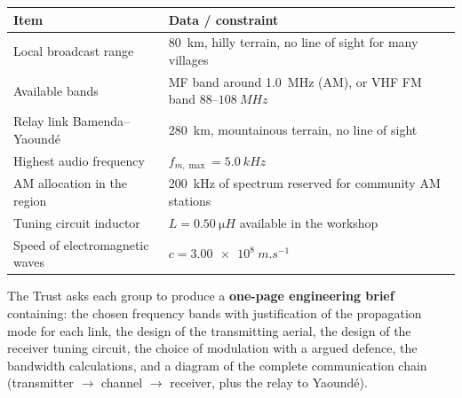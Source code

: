 \documentclass[11pt]{article}
\newcounter{popsec}
\newcounter{popsub}
\newcommand{\courssub}[1]{%
  \stepcounter{popsub}%
  \par\vspace{9pt}\noindent{\popxbold\fontsize{11.5}{13}\selectfont\color{popink}{\color{poporange}\thepopsec.\thepopsub}\hspace{6pt}#1}\par\nopagebreak\vspace{4pt}
}
\begin{document}
\begin{center}
\begin{tabularx}{\linewidth}{|l|X|}
\hline
\rowcolor{popblueL} \textbf{Item} & \textbf{Data / constraint} \\
\hline
Local broadcast range & \SI{80}{km}, hilly terrain, no line of sight for many villages \\
\hline
Available bands & MF band around \SI{1.0}{MHz} (AM), or VHF FM band $88$--$\SI{108}{MHz}$ \\
\hline
Relay link Bamenda--Yaoundé & \SI{280}{km}, mountainous terrain, no line of sight \\
\hline
Highest audio frequency & $f_{m,\max} = \SI{5.0}{kHz}$ \\
\hline
AM allocation in the region & \SI{200}{kHz} of spectrum reserved for community AM stations \\
\hline
Tuning circuit inductor & $L = \SI{0.50}{\micro H}$ available in the workshop \\
\hline
Speed of electromagnetic waves & $c = \SI{3.00e8}{m.s^{-1}}$ \\
\hline
\end{tabularx}
\end{center}

The Trust asks each group to produce a \textbf{one-page engineering brief} containing: the chosen frequency bands with justification of the propagation mode for each link, the design of the transmitting aerial, the design of the receiver tuning circuit, the choice of modulation with a argued defence, the bandwidth calculations, and a diagram of the complete communication chain (transmitter $\rightarrow$ channel $\rightarrow$ receiver, plus the relay to Yaoundé).

\courssub{Tasks}
\end{document}
